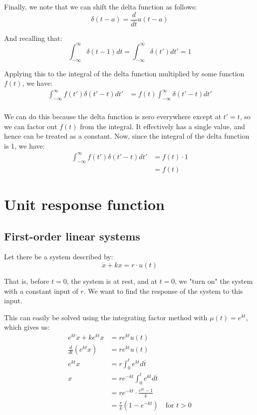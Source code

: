 Finally, we note that we can shift the delta function as follows:
\begin{equation*}
\delta(t - a) = \frac{d}{dt} u(t - a) 
\end{equation*}

And recalling that:
\begin{equation*}
\int_{-\infty}^{\infty} \delta(t - 1) dt = \int_{-\infty}^{\infty} \delta(t') dt' = 1
\end{equation*}

Applying this to the integral of the delta function multiplied by some function $f(t)$, we have:
\begin{align*}
\int_{-\infty}^{\infty} f(t') \delta (t' - t) dt' &= f(t) \int_{-\infty}^{\infty} \delta(t' - t) dt' \\ 
\end{align*}

We can do this because the delta function is zero everywhere except at $t' = t$, so we can factor out $f(t)$ from the integral. It effectively has a single value, and hence can be treated as a constant. Now, since the integral of the delta function is 1, we have:
\begin{align*}
\int_{-\infty}^{\infty} f(t') \delta (t' - t) dt' &= f(t) \cdot 1 \\
&= f(t)
\end{align*}

\section{Unit response function}
\subsection{First-order linear systems}

Let there be a system described by:
\[
\dot{x} + kx = r \cdot u(t)
\]

That is, before $t = 0$, the system is at rest, and at $t = 0$, we "turn on" the system with a constant input of $r$. We want to find the response of the system to this input.

This can easily be solved using the integrating factor method with $\mu(t) = e^{kt}$, which gives us:
\begin{align*}
e^{kt} \dot{x} + ke^{kt} x &= re^{kt} u(t) \\
\frac{d}{dt} (e^{kt} x) &= re^{kt} u(t) \\
e^{kt} x &= r \int_{0}^{t} e^{k\overline{t}} d\overline{t} \\
x &= re^{-kt} \int_{0}^{t} e^{k\overline{t}} d\overline{t} \\
&= re^{-kt} \cdot \frac{e^{kt} - 1}{k} \\
&= \frac{r}{k} (1 - e^{-kt}) \quad \text{for } t > 0
\end{align*}


